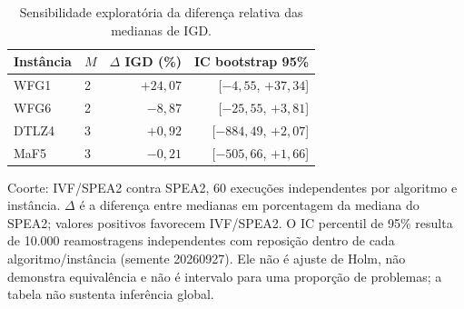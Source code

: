 \begin{table}[!htb]
    \centering
    \small
    \setlength{\tabcolsep}{5pt}
    \caption{Sensibilidade exploratória da diferença relativa das medianas de IGD.}
    \label{tab:magnitude_sensibilidade}
    \begin{tabular*}{\textwidth}{@{\extracolsep{\fill}}llrr@{}}
        \toprule
        \textbf{Instância} & \textbf{$M$} & \textbf{$\Delta$ IGD (\%)} & \textbf{IC bootstrap 95\%} \\
        \midrule
        WFG1 & 2 & $+24{,}07$ & [$-4{,}55$, $+37{,}34$] \\
        WFG6 & 2 & $-8{,}87$ & [$-25{,}55$, $+3{,}81$] \\
        DTLZ4 & 3 & $+0{,}92$ & [$-884{,}49$, $+2{,}07$] \\
        MaF5 & 3 & $-0{,}21$ & [$-505{,}66$, $+1{,}66$] \\
        \bottomrule
    \end{tabular*}
    \par\smallskip
    \parbox{\textwidth}{\footnotesize
    Coorte: IVF/SPEA2 contra SPEA2, 60 execuções independentes por algoritmo e instância. $\Delta$ é a diferença entre medianas em porcentagem da mediana do SPEA2; valores positivos favorecem IVF/SPEA2. O IC percentil de 95\% resulta de 10.000 reamostragens independentes com reposição dentro de cada algoritmo/instância (semente 20260927). Ele não é ajuste de Holm, não demonstra equivalência e não é intervalo para uma proporção de problemas; a tabela não sustenta inferência global.
    }
\end{table}
